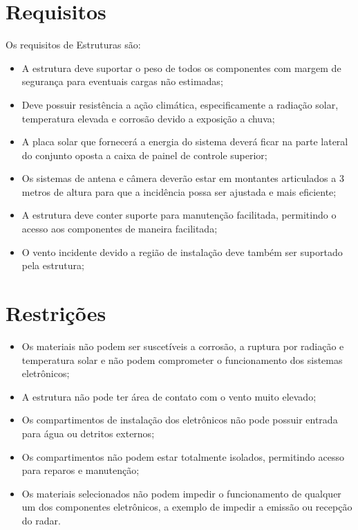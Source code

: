 \chapter{Requisitos}

Os requisitos de Estruturas são:


\begin{itemize}
\item A estrutura deve suportar o peso de todos os componentes com margem de segurança para eventuais cargas não estimadas;
\item Deve possuir resistência a ação climática, especificamente a radiação solar, temperatura elevada e corrosão devido a exposição a chuva;
\item A placa solar que fornecerá a energia do sistema deverá ficar na parte lateral do conjunto oposta a caixa de painel de controle superior;
\item Os sistemas de antena e câmera deverão estar em montantes articulados a 3 metros de altura para que a incidência possa ser ajustada e mais eficiente;
\item A estrutura deve conter suporte para manutenção facilitada, permitindo o acesso aos componentes de maneira facilitada;
\item O vento incidente devido a região de instalação deve também ser suportado pela estrutura;
\end{itemize}

\chapter{Restrições}
\begin{itemize}
\item Os materiais não podem ser suscetíveis a corrosão, a ruptura por radiação e temperatura solar e não podem comprometer o funcionamento dos sistemas eletrônicos;
\item A estrutura não pode ter área de contato com o vento muito elevado;
\item Os compartimentos de instalação dos eletrônicos não pode possuir entrada para água ou detritos externos;
\item Os compartimentos não podem estar totalmente isolados, permitindo acesso para reparos e manutenção;
\item Os materiais selecionados não podem impedir o funcionamento de qualquer um dos componentes eletrônicos, a exemplo de impedir a emissão ou recepção do radar.
\end{itemize}

